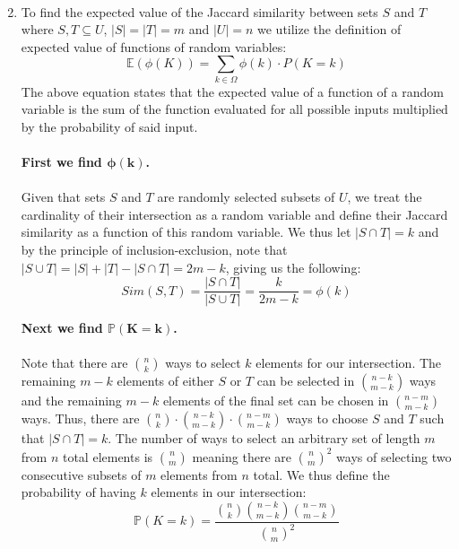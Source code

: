 \documentclass{article}
\begin{document}
\begin{enumerate}[label=\alph*., left=10pt, itemsep=10pt]
\begin{minipage}[t]{0.9\textwidth}
\begin{align*}
            \end{align*}
        \end{minipage}
        \item \begin{minipage}[t]{0.9\textwidth}
            To find the expected value of the Jaccard similarity between sets $S$ and $T$ where $S, T \subseteq U$, $|S|=|T| = m$
            and $|U|= n$ we utilize the definition of expected value of functions of random variables:\\
            \begin{equation}
                \mathbb{E}(\phi(K)) = \sum\limits_{k \in \Omega} \phi(k)\cdot P(K=k)
            \end{equation}
            The above equation states that the expected value of a function of a random variable is the sum of the function evaluated
            for all possible inputs multiplied by the probability of said input.
            \\\\
            \textbf{First we find $\mathbf{\phi(k)}$.}\\\\
            Given that sets $S$ and $T$ are randomly selected subsets of $U$, we treat the cardinality of their intersection as a random
            variable and define their Jaccard similarity as a function of this random variable. We thus let $|S \cap T| = k$ and
            by the principle of inclusion-exclusion, note that $|S \cup T| = |S| + |T| - |S \cap T| = 2m - k$, giving us the following:
            \begin{equation}
                Sim(S,T) = \frac{|S \cap T|}{|S \cup T|} = \frac{k}{2m-k} = \phi(k)
            \end{equation}

            \textbf{Next we find $\mathbf{\mathbb{P}(K=k)}$.}\\\\
            Note that there are $\binom{n}{k}$ ways to select $k$ elements for our intersection. The remaining $m-k$ elements
            of either $S$ or $T$ can be selected in $\binom{n-k}{m-k}$ ways and the remaining $m-k$ elements of the final
            set can be chosen in $\binom{n-m}{m-k}$ ways. Thus, there are $\binom{n}{k} \cdot \binom{n-k}{m-k}
            \cdot \binom{n-m}{m-k}$ ways to choose $S$ and $T$ such that $|S \cap T| = k$.
            The number of ways to select an arbitrary set of length $m$ from $n$ total elements is $\binom{n}{m}$ meaning there
            are $\binom{n}{m}^{2}$ ways of selecting two consecutive subsets of $m$ elements from $n$ total.
            We thus define the probability of having $k$ elements in our intersection:
            \begin{equation}
                \mathbb{P}(K=k) = \frac{\binom{n}{k}\binom{n-k}{m-k}\binom{n-m}{m-k}}{\binom{n}{m}^{2}}
            \end{equation}


\end{minipage}
\end{enumerate}
\end{document}
